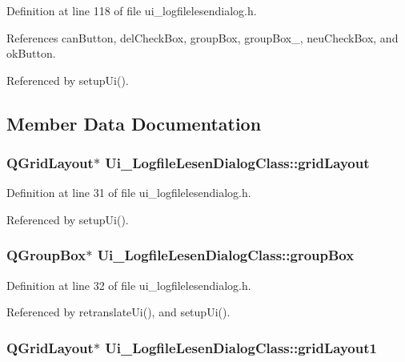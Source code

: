 Definition at line 118 of file ui\_\-logfilelesendialog.h.

References canButton, delCheckBox, groupBox, groupBox\_, neuCheckBox, and okButton.

Referenced by setupUi().

\subsection{Member Data Documentation}
\hypertarget{class_ui___logfile_lesen_dialog_class_4e546ee21e99638d9563869820e750c1}{
\subsubsection[gridLayout]{\setlength{\rightskip}{0pt plus 5cm}QGridLayout$\ast$ {\bf Ui\_\-LogfileLesenDialogClass::gridLayout}}}
\label{class_ui___logfile_lesen_dialog_class_4e546ee21e99638d9563869820e750c1}




Definition at line 31 of file ui\_\-logfilelesendialog.h.

Referenced by setupUi().\hypertarget{class_ui___logfile_lesen_dialog_class_3b1c8005dc5516081b6d0a7c54faa174}{
\subsubsection[groupBox]{\setlength{\rightskip}{0pt plus 5cm}QGroupBox$\ast$ {\bf Ui\_\-LogfileLesenDialogClass::groupBox}}}
\label{class_ui___logfile_lesen_dialog_class_3b1c8005dc5516081b6d0a7c54faa174}




Definition at line 32 of file ui\_\-logfilelesendialog.h.

Referenced by retranslateUi(), and setupUi().\hypertarget{class_ui___logfile_lesen_dialog_class_efe6e079783a98274b2e71acce997ead}{
\subsubsection[gridLayout1]{\setlength{\rightskip}{0pt plus 5cm}QGridLayout$\ast$ {\bf Ui\_\-LogfileLesenDialogClass::gridLayout1}}}
\label{class_ui___logfile_lesen_dialog_class_efe6e079783a98274b2e71acce997ead}




